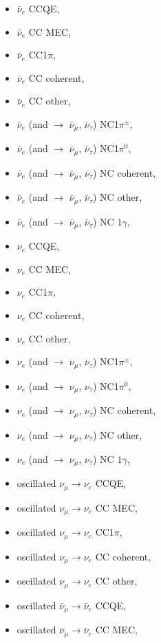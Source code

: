 \begin{itemize}
\item  $\bar{\nu}_{e}$ CCQE,
\item  $\bar{\nu}_{e}$ CC MEC,
\item  $\bar{\nu}_{e}$ CC1$\pi$,
\item  $\bar{\nu}_{e}$ CC coherent,
\item  $\bar{\nu}_{e}$ CC other,
\item  $\bar{\nu}_{e}$ (and $\rightarrow$ $\bar{\nu}_{\mu}$, $\bar{\nu}_{\tau}$) NC1$\pi^{\pm}$,
\item  $\bar{\nu}_{e}$ (and $\rightarrow$ $\bar{\nu}_{\mu}$, $\bar{\nu}_{\tau}$) NC1$\pi^{0}$,
\item  $\bar{\nu}_{e}$ (and $\rightarrow$ $\bar{\nu}_{\mu}$, $\bar{\nu}_{\tau}$) NC coherent,
\item  $\bar{\nu}_{e}$ (and $\rightarrow$ $\bar{\nu}_{\mu}$, $\bar{\nu}_{\tau}$) NC other,
\item  $\bar{\nu}_{e}$ (and $\rightarrow$ $\bar{\nu}_{\mu}$, $\bar{\nu}_{\tau}$) NC $1\gamma$,
\item  $\nu_{e}$ CCQE, 
\item  $\nu_{e}$ CC MEC,
\item  $\nu_{e}$ CC1$\pi$,
\item  $\nu_{e}$ CC coherent,
\item  $\nu_{e}$ CC other,
\item  $\nu_{e}$ (and $\rightarrow$ $\nu_{\mu}$, $\nu_{\tau}$) NC1$\pi^{\pm}$,
\item  $\nu_{e}$ (and $\rightarrow$ $\nu_{\mu}$, $\nu_{\tau}$) NC1$\pi^{0}$,
\item  $\nu_{e}$ (and $\rightarrow$ $\nu_{\mu}$, $\nu_{\tau}$) NC coherent,
\item  $\nu_{e}$ (and $\rightarrow$ $\nu_{\mu}$, $\nu_{\tau}$) NC other,
\item  $\nu_{e}$ (and $\rightarrow$ $\nu_{\mu}$, $\nu_{\tau}$) NC $1\gamma$,
\item  oscillated $\nu_{\mu} \rightarrow \nu_{e}$ CCQE,
\item  oscillated $\nu_{\mu} \rightarrow \nu_{e}$ CC MEC,
\item  oscillated $\nu_{\mu} \rightarrow \nu_{e}$ CC1$\pi$,
\item  oscillated $\nu_{\mu} \rightarrow \nu_{e}$ CC coherent,
\item  oscillated $\nu_{\mu} \rightarrow \nu_{e}$ CC other,
\item  oscillated $\bar{\nu}_{\mu} \rightarrow \bar{\nu}_{e}$ CCQE,
\item  oscillated $\bar{\nu}_{\mu} \rightarrow \bar{\nu}_{e}$ CC MEC,

\end{itemize}
